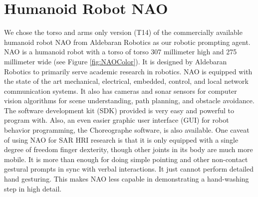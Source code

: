 \section{Humanoid Robot NAO}

We chose the torso and arms only version (T14) of the commercially available humanoid robot NAO from Aldebaran Robotics as our robotic prompting agent.  NAO is a humanoid robot with a torso of torso 307 millimeter high and 275 millimeter wide (see Figure \ref{fig:NAOColor}).  It is designed by Aldebaran Robotics to primarily serve academic research in robotics.  NAO is equipped with the state of the art mechanical, electrical, embedded, control, and local network communication systems.  It also has cameras and sonar sensors for computer vision algorithms for scene understanding, path planning, and obstacle avoidance.  The software development kit (SDK) provided is very easy and powerful to program with.  Also, an even easier graphic user interface (GUI) for robot behavior programming, the Choreographe software, is also available.  One caveat of using NAO for SAR HRI research is that it is only equipped with a single degree of freedom finger dexterity, though other joints in its body are much more mobile.  It is more than enough for doing simple pointing and other non-contact gestural prompts in sync with verbal interactions.  It just cannot perform detailed hand gesturing.  This makes NAO less capable in demonstrating a hand-washing step in high detail.
